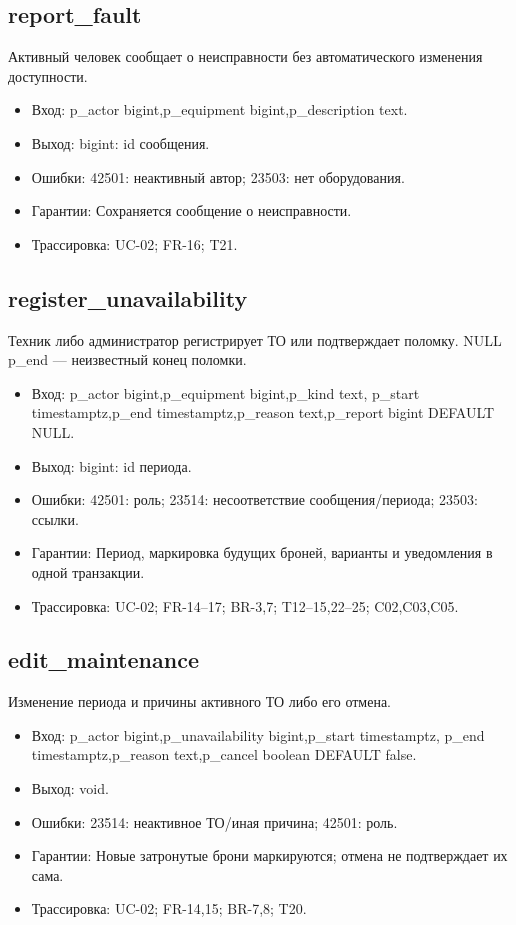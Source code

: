 \subsection{report\_\allowbreak{}fault}
Активный человек сообщает о неисправности без автоматического изменения доступности.
\begin{itemize}
\item Вход: p\_\allowbreak{}actor bigint,p\_\allowbreak{}equipment bigint,p\_\allowbreak{}description text.
\item Выход: bigint: id сообщения.
\item Ошибки: 42501: неактивный автор; 23503: нет оборудования.
\item Гарантии: Сохраняется сообщение о неисправности.
\item Трассировка: UC-02; FR-16; T21.
\end{itemize}
\subsection{register\_\allowbreak{}unavailability}
Техник либо администратор регистрирует ТО или подтверждает поломку. NULL p\_\allowbreak{}end — неизвестный конец поломки.
\begin{itemize}
\item Вход: p\_\allowbreak{}actor bigint,p\_\allowbreak{}equipment bigint,p\_\allowbreak{}kind text,  p\_\allowbreak{}start timestamptz,p\_\allowbreak{}end timestamptz,p\_\allowbreak{}reason text,p\_\allowbreak{}report bigint DEFAULT NULL.
\item Выход: bigint: id периода.
\item Ошибки: 42501: роль; 23514: несоответствие сообщения/\allowbreak{}периода; 23503: ссылки.
\item Гарантии: Период, маркировка будущих броней, варианты и уведомления в одной транзакции.
\item Трассировка: UC-02; FR-14–17; BR-3,7; T12–15,22–25; C02,C03,C05.
\end{itemize}
\subsection{edit\_\allowbreak{}maintenance}
Изменение периода и причины активного ТО либо его отмена.
\begin{itemize}
\item Вход: p\_\allowbreak{}actor bigint,p\_\allowbreak{}unavailability bigint,p\_\allowbreak{}start timestamptz,  p\_\allowbreak{}end timestamptz,p\_\allowbreak{}reason text,p\_\allowbreak{}cancel boolean DEFAULT false.
\item Выход: void.
\item Ошибки: 23514: неактивное ТО/\allowbreak{}иная причина; 42501: роль.
\item Гарантии: Новые затронутые брони маркируются; отмена не подтверждает их сама.
\item Трассировка: UC-02; FR-14,15; BR-7,8; T20.
\end{itemize}
